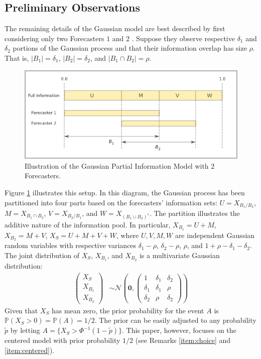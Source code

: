 \documentclass[12pt]{article}
\renewcommand{\P}{\mathbb{P}}
\theoremstyle{definition}
\theoremstyle{definition}
\def\P{{\mathbb P}}
\begin{document}
\subsection{Preliminary Observations}
\label{prelim}
The remaining details of the Gaussian model are best described by first considering only two Forecasters $1$ and $2$ . Suppose they observe respective $\delta_1$ and
$\delta_2$ portions of the Gaussian process and that their information overlap has size $\rho$. That is, $|B_1| = \delta_1$, $|B_2| = \delta_2$, and $|B_1 \cap B_2| = \rho$.
\begin{figure}[t]
   \includegraphics[width = \textwidth]{N=2} %
   \caption{Illustration of the Gaussian Partial Information Model with $2$ Forecasters.}
   \label{diagram2}
\end{figure}
Figure \ref{diagram2} illustrates this setup.  In this diagram, the
Gaussian process has been partitioned into four parts based on the
forecasters' information sets: $U = X_{B_1 / B_2}$, $M = X_{B_1 \cap B_2}$, $V = X_{B_2 / B_1}$, and $W = X_{(B_1 \cup B_2)^c}$. The partition illustrates the additive nature of the information pool. In particular, $X_{B_1} = U + M$,  $X_{B_2} = M + V$, $X_S = U+M+V+W$, where $U, V, M, W$ are independent Gaussian random variables with respective variances
$\delta_1-\rho$, $\delta_2-\rho$, $\rho$, and $1+\rho-\delta_1 -
\delta_2$. The joint distribution of $X_{S}$, $X_{B_1}$, and $X_{B_2}$ is a
multivariate Gaussian distribution:
\begin{align}
\left(\begin{matrix} X_S \\ X_{B_1}\\ X_{B_2} \end{matrix}\right) 
 &\sim \mathcal{N}\left(
 \boldsymbol{0},  \left(\begin{matrix} 
1 & \delta_1 & \delta_2\\
\delta_1 & \delta_1 &\rho\\
\delta_2 & \rho & \delta_2
 \end{matrix}\right)\right) \label{twoforecasters}
\end{align}
Given that $X_S$ has mean zero, the prior probability for the event $A$ is
$\P(X_S > 0) = \P(A) = 1/2$. The prior can be easily adjusted to any probability
$\tilde{p}$ by letting $A = \{ X_S > \Phi^{-1}(1-\tilde{p}) \}$. This
paper, however, focuses on the centered model with prior probability
$1/2$ (see Remarks \ref{item:choice} and \ref{item:centered}).
\end{document}
